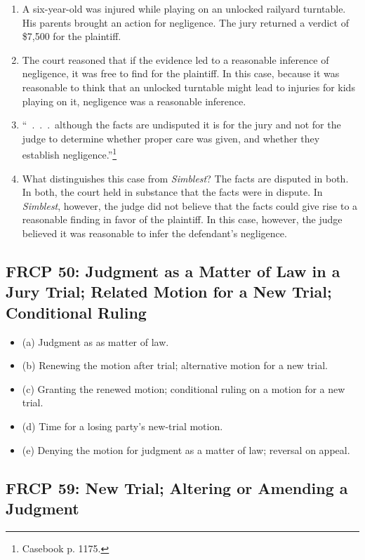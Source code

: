 \begin{enumerate}
    \item A six-year-old was injured while playing on an unlocked railyard 
    turntable. His parents brought an action for negligence. The jury returned 
    a verdict of \$7,500 for the plaintiff.
    \item The court reasoned that if the evidence led to a reasonable 
    inference of negligence, it was free to find for the plaintiff. In this 
    case, because it was reasonable to think that an unlocked turntable might 
    lead to injuries for kids playing on it, negligence was a reasonable 
    inference.
    \item ``~.~.~.~although the facts are undisputed it is for the jury and not 
    for the judge to determine whether proper care was given, and whether they 
    establish negligence.''\footnote{Casebook p. 1175.}
    \item What distinguishes this case from \emph{Simblest}? The facts are 
    disputed in both. In both, the court held in substance that the facts were 
    in dispute. In \emph{Simblest}, however, the judge did not believe that 
    the facts could give rise to a reasonable finding in favor of the 
    plaintiff. In this case, however, the judge believed it was reasonable to 
    infer the defendant's negligence.
\end{enumerate}

\subsection{FRCP 50: Judgment as a Matter of Law in a Jury Trial; Related 
Motion for a New Trial; Conditional Ruling}

\begin{itemize}
    \item (a) Judgment as as matter of law.
    \item (b) Renewing the motion after trial; alternative motion for a new 
    trial.
    \item (c) Granting the renewed motion; conditional ruling on a motion for 
    a new trial.
    \item (d) Time for a losing party's new-trial motion.
    \item (e) Denying the motion for judgment as a matter of law; reversal on 
    appeal.
\end{itemize}

\subsection{FRCP 59: New Trial; Altering or Amending a Judgment}

